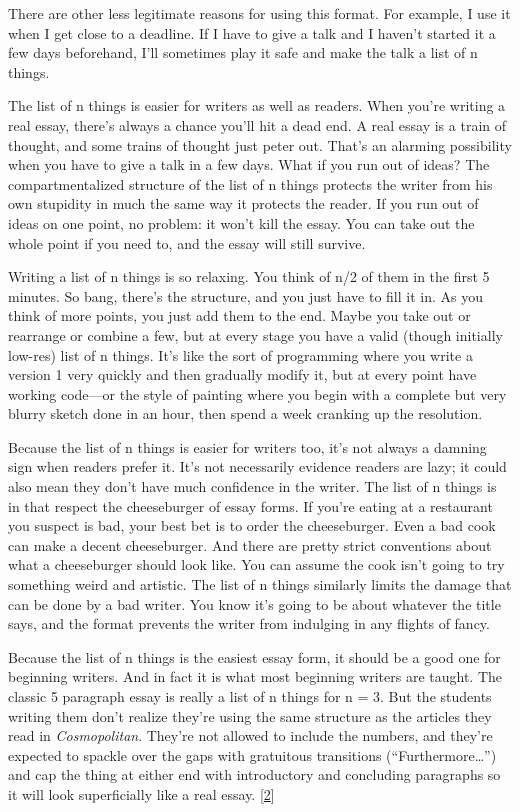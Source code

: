 There are other less legitimate reasons for using this format. For
example, I use it when I get close to a deadline. If I have to give a
talk and I haven't started it a few days beforehand, I'll sometimes play
it safe and make the talk a list of n things.

The list of n things is easier for writers as well as readers. When
you're writing a real essay, there's always a chance you'll hit a dead
end. A real essay is a train of thought, and some trains of thought just
peter out. That's an alarming possibility when you have to give a talk
in a few days. What if you run out of ideas? The compartmentalized
structure of the list of n things protects the writer from his own
stupidity in much the same way it protects the reader. If you run out of
ideas on one point, no problem: it won't kill the essay. You can take
out the whole point if you need to, and the essay will still survive.

Writing a list of n things is so relaxing. You think of n/2 of them in
the first 5 minutes. So bang, there's the structure, and you just have
to fill it in. As you think of more points, you just add them to the
end. Maybe you take out or rearrange or combine a few, but at every
stage you have a valid (though initially low-res) list of n things. It's
like the sort of programming where you write a version 1 very quickly
and then gradually modify it, but at every point have working code---or
the style of painting where you begin with a complete but very blurry
sketch done in an hour, then spend a week cranking up the resolution.

Because the list of n things is easier for writers too, it's not always
a damning sign when readers prefer it. It's not necessarily evidence
readers are lazy; it could also mean they don't have much confidence in
the writer. The list of n things is in that respect the cheeseburger of
essay forms. If you're eating at a restaurant you suspect is bad, your
best bet is to order the cheeseburger. Even a bad cook can make a decent
cheeseburger. And there are pretty strict conventions about what a
cheeseburger should look like. You can assume the cook isn't going to
try something weird and artistic. The list of n things similarly limits
the damage that can be done by a bad writer. You know it's going to be
about whatever the title says, and the format prevents the writer from
indulging in any flights of fancy.

Because the list of n things is the easiest essay form, it should be a
good one for beginning writers. And in fact it is what most beginning
writers are taught. The classic 5 paragraph essay is really a list of n
things for n = 3. But the students writing them don't realize they're
using the same structure as the articles they read in
\emph{Cosmopolitan}. They're not allowed to include the numbers, and
they're expected to spackle over the gaps with gratuitous transitions
(``Furthermore\ldots{}'') and cap the thing at either end with
introductory and concluding paragraphs so it will look superficially
like a real essay. {[}\hyperref[f2n]{2}{]}

